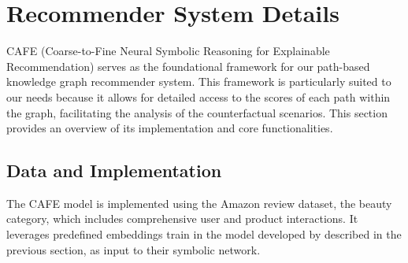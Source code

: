 \section{Recommender System Details}
CAFE (Coarse-to-Fine Neural Symbolic Reasoning for Explainable Recommendation)
serves as the foundational framework for our path-based knowledge graph
recommender system. This framework is particularly suited to our needs because it
allows for detailed access to the scores of each path within the graph,
facilitating the analysis of the counterfactual scenarios. This section provides
an overview of its implementation and core functionalities.

\subsection{Data and Implementation}
The CAFE model is implemented using the Amazon review dataset, the beauty
category, which includes comprehensive user and product interactions. It
leverages predefined embeddings train in the model developed by \textcite{ai_learning_2018} described
in the previous section, as input to their symbolic network.
